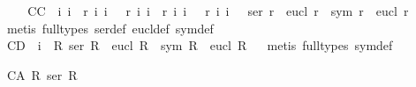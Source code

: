 \begin{isabellebody}
{}
%
\isadelimproof
\ %
\endisadelimproof
%
\isatagproof
{}\isamarkupfalse%
%
\endisatagproof
{\isafoldproof}%
%
\isadelimproof
%
\endisadelimproof
\ \isanewline
{}\isamarkupfalse%
\ C{}{\isacharunderscore}C{\isacharcolon}\ {\isachardoublequoteopen}{\isacharhash}\ i{}\ i{}\ {\isasymand}\ r\ i{}\ i{}\ {\isasymand}\ {\isasymnot}\ r\ i{}\ i{}\ {\isasymand}\ r\ i{}\ i{}\ {\isasymand}\ {\isasymnot}\ r\ i{}\ i{}\ {\isasymlongrightarrow}\ {\isasymnot}\ {\isacharparenleft}ser\ r\ {\isasymand}\ eucl\ r\ {\isasymlongrightarrow}\ {\isacharparenleft}sym\ r\ {\isasymand}\ eucl\ r{\isacharparenright}{\isacharparenright}{\isachardoublequoteclose}\ \isanewline
%
\isadelimproof
\ %
\endisadelimproof
%
\isatagproof
{}\isamarkupfalse%
\ {\isacharparenleft}metis\ {\isacharparenleft}full{\isacharunderscore}types{\isacharparenright}\ ser{\isacharunderscore}def\ eucl{\isacharunderscore}def\ sym{\isacharunderscore}def{\isacharparenright}%
\endisatagproof
{\isafoldproof}%
%
\isadelimproof
\isanewline
%
\endisadelimproof
{}\isamarkupfalse%
\ C{}{\isacharunderscore}D{\isacharcolon}\ {\isachardoublequoteopen}{\isacharhash}\ i{}\ {\isasymlongrightarrow}\ {\isacharparenleft}{\isasymforall}R{\isachardot}\ ser\ R\ {\isasymand}\ eucl\ R\ {\isasymlongrightarrow}\ {\isacharparenleft}sym\ R\ {\isasymand}\ eucl\ R{\isacharparenright}{\isacharparenright}{\isachardoublequoteclose}%
\isadelimproof
\ %
\endisadelimproof
%
\isatagproof
{}\isamarkupfalse%
\ {\isacharparenleft}metis\ {\isacharparenleft}full{\isacharunderscore}types{\isacharparenright}\ sym{\isacharunderscore}def{\isacharparenright}%
\endisatagproof
{\isafoldproof}%
%
\isadelimproof
%
\endisadelimproof
%
\begin{isamarkuptext}%
\begin{isbfig}{7em}
\end{isbfig}%
\end{isamarkuptext}%
\isamarkuptrue%
%
\isamarkuptrue%
\isamarkupfalse%
\ C{}{\isacharunderscore}A{\isacharcolon}\ {\isachardoublequoteopen}{\isasymforall}R{\isachardot}\ ser\ R{\isachardoublequoteclose}\ \isamarkupfalse%

\end{isabellebody}
